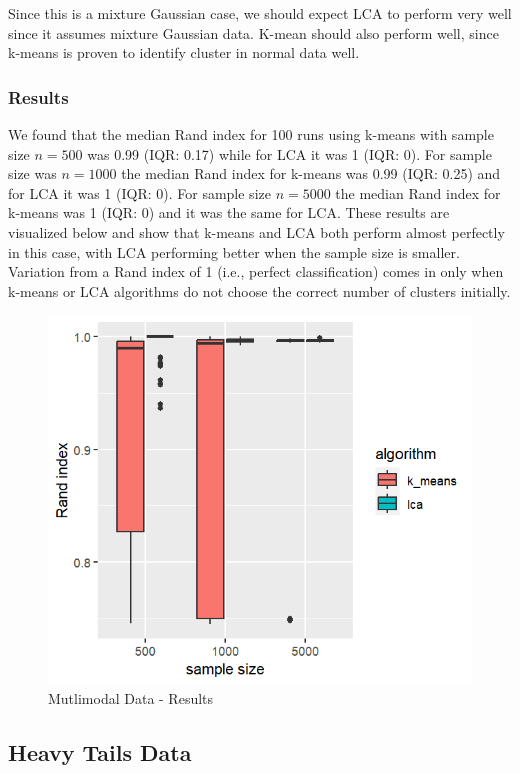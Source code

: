 \documentclass[
]{article}
\begin{document}
Since this is a mixture Gaussian case, we should expect LCA to perform
very well since it assumes mixture Gaussian data. K-mean should also
perform well, since k-means is proven to identify cluster in normal data
well.

\hypertarget{results-1}{%
\subsubsection{Results}\label{results-1}}

We found that the median Rand index for 100 runs using k-means with
sample size \(n=500\) was 0.99 (IQR: 0.17) while for LCA it was 1 (IQR:
0). For sample size was \(n=1000\) the median Rand index for k-means was
0.99 (IQR: 0.25) and for LCA it was 1 (IQR: 0). For sample size
\(n=5000\) the median Rand index for k-means was 1 (IQR: 0) and it was
the same for LCA. These results are visualized below and show that
k-means and LCA both perform almost perfectly in this case, with LCA
performing better when the sample size is smaller. Variation from a Rand
index of 1 (i.e., perfect classification) comes in only when k-means or
LCA algorithms do not choose the correct number of clusters initially.

\begin{figure}
\centering
\includegraphics{report_image/multimodal_results.png}
\caption{Mutlimodal Data - Results}
\end{figure}

\hypertarget{heavy-tails-data}{%
\subsection{Heavy Tails Data}\label{heavy-tails-data}}
\end{document}
